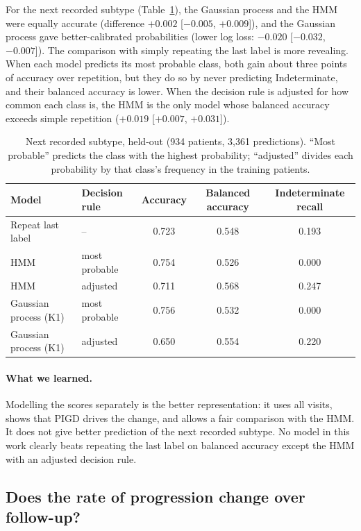 \documentclass[11pt,a4paper]{article}
\begin{document}
For the next recorded subtype (Table~\ref{tab:subtype}), the Gaussian process
and the HMM were equally accurate (difference $+0.002$ [$-0.005$, $+0.009$]),
and the Gaussian process gave better-calibrated probabilities (lower log loss:
$-0.020$ [$-0.032$, $-0.007$]). The comparison with simply repeating the last
label is more revealing. When each model predicts its most probable class, both
gain about three points of accuracy over repetition, but they do so by never
predicting Indeterminate, and their balanced accuracy is lower. When the
decision rule is adjusted for how common each class is, the HMM is the only
model whose balanced accuracy exceeds simple repetition ($+0.019$ [$+0.007$,
$+0.031$]).

\begin{table}[H]
  \centering
  \small
  \caption{Next recorded subtype, held-out (934 patients, 3,361 predictions).
  ``Most probable'' predicts the class with the highest probability; ``adjusted''
  divides each probability by that class's frequency in the training patients.}
  \label{tab:subtype}
  \begin{tabular}{llccc}
    \toprule
    Model & Decision rule & Accuracy & Balanced accuracy & Indeterminate recall \\
    \midrule
    Repeat last label & -- & 0.723 & 0.548 & 0.193 \\
    HMM & most probable & 0.754 & 0.526 & 0.000 \\
    HMM & adjusted & 0.711 & 0.568 & 0.247 \\
    Gaussian process (K1) & most probable & 0.756 & 0.532 & 0.000 \\
    Gaussian process (K1) & adjusted & 0.650 & 0.554 & 0.220 \\
    \bottomrule
  \end{tabular}
\end{table}

\paragraph{What we learned.} Modelling the scores separately is the better
representation: it uses all visits, shows that PIGD drives the change, and
allows a fair comparison with the HMM. It does not give better prediction of
the next recorded subtype. No model in this work clearly beats repeating the
last label on balanced accuracy except the HMM with an adjusted decision rule.

\subsection{Does the rate of progression change over follow-up?}
\end{document}
